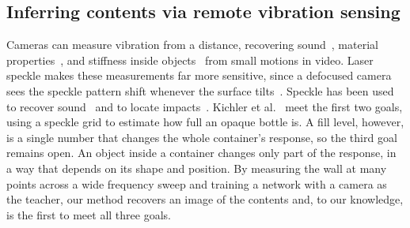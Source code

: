 \subsection{Inferring contents via remote vibration sensing}
Cameras can measure vibration from a distance, recovering sound~\cite{davis2014visual}, material properties~\cite{bouman2013estimating,davis2015visual}, and stiffness inside objects~\cite{feng2022visual,ogren2025visual} from small motions in video.
Laser speckle makes these measurements far more sensitive, since a defocused camera sees the speckle pattern shift whenever the surface tilts~\cite{zalevsky2009simultaneous}.
Speckle has been used to recover sound~\cite{sheinin2022dual,cai2025event2audio,bagon2026drum} and to locate impacts~\cite{zhang2023analyzing}.
Kichler et al.~\cite{kichler2025learning} meet the first two goals, using a speckle grid to estimate how full an opaque bottle is.
A fill level, however, is a single number that changes the whole container's response, so the third goal remains open.
An object inside a container changes only part of the response, in a way that depends on its shape and position.
By measuring the wall at many points across a wide frequency sweep and training a network with a camera as the teacher, our method recovers an image of the contents and, to our knowledge, is the first to meet all three goals.
